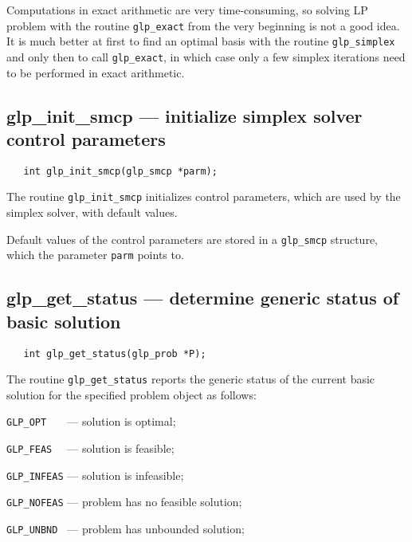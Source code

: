 
Computations in exact arithmetic are very time-consuming, so solving
LP problem with the routine \verb|glp_exact| from the very beginning is
not a good idea. It is much better at first to find an optimal basis
with the routine \verb|glp_simplex| and only then to call
\verb|glp_exact|, in which case only a few simplex iterations need to
be performed in exact arithmetic.

\newpage

\subsection{glp\_init\_smcp --- initialize simplex solver control
parameters}

\synopsis

\begin{verbatim}
   int glp_init_smcp(glp_smcp *parm);
\end{verbatim}

\description

The routine \verb|glp_init_smcp| initializes control parameters, which
are used by the simplex solver, with default values.

Default values of the control parameters are stored in
a \verb|glp_smcp| structure, which the parameter \verb|parm| points to.

\subsection{glp\_get\_status --- determine generic status of basic
solution}

\synopsis

\begin{verbatim}
   int glp_get_status(glp_prob *P);
\end{verbatim}

\returns

The routine \verb|glp_get_status| reports the generic status of the
current basic solution for the specified problem object as follows:

\verb|GLP_OPT   | --- solution is optimal;

\verb|GLP_FEAS  | --- solution is feasible;

\verb|GLP_INFEAS| --- solution is infeasible;

\verb|GLP_NOFEAS| --- problem has no feasible solution;

\verb|GLP_UNBND | --- problem has unbounded solution;

